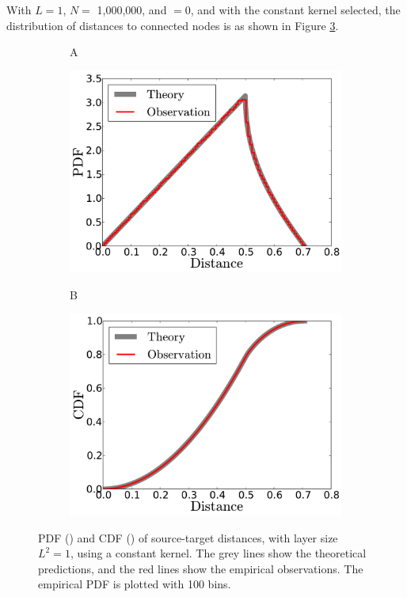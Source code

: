 With $L = 1$, $N =$ 1,000,000, and  $= 0$, and with the constant kernel selected, the distribution of distances to connected nodes is as shown in Figure \ref{fig:res_constant}. 
\begin{figure}[b]
\centering
\begin{subfigure}[b]{0.49\textwidth}
	  \begin{flushleft}
	  \large A
		\end{flushleft}
    \centering
    \includegraphics[width=\textwidth]{2D_constant_PDF.pdf}
    \label{subfig:res_constant_PDF}
\end{subfigure}
\begin{subfigure}[b]{0.49\textwidth}
	  \begin{flushleft}
	  \large B
		\end{flushleft}
    \centering
    \includegraphics[width=\textwidth]{2D_constant_CDF.pdf}
    \label{subfig:res_constant_CDF}
\end{subfigure}
\caption[Theoretical and empirical PDF and CDF of source-target distances using a constant kernel]{PDF () and CDF () of source-target distances, with layer size $L^2=1$, using a constant kernel. The grey lines show the theoretical predictions, and the red lines show the empirical observations. The empirical PDF is plotted with 100 bins.}
\label{fig:res_constant}
\end{figure}
